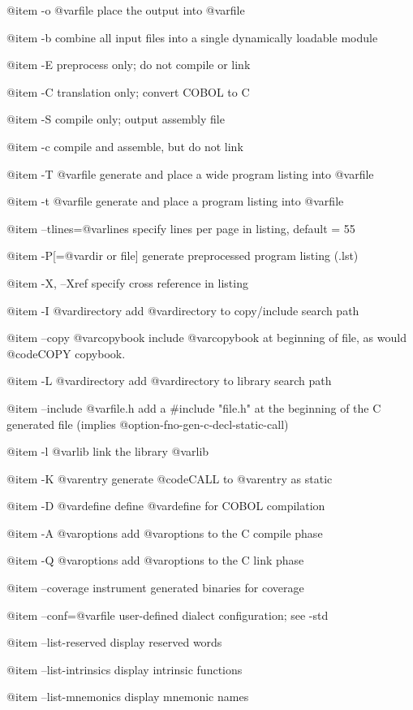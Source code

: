 @item -o @var{file}
place the output into @var{file}

@item -b
combine all input files into a single
dynamically loadable module

@item -E
preprocess only; do not compile or link

@item -C
translation only; convert COBOL to C

@item -S
compile only; output assembly file

@item -c
compile and assemble, but do not link

@item -T @var{file}
generate and place a wide program listing into @var{file}

@item -t @var{file}
generate and place a program listing into @var{file}

@item --tlines=@var{lines}
specify lines per page in listing, default = 55

@item -P[=@var{dir or file}]
generate preprocessed program listing (.lst)

@item -X, --Xref
specify cross reference in listing

@item -I @var{directory}
add @var{directory} to copy/include search path

@item --copy @var{copybook}
include @var{copybook} at beginning of file,
as would @code{COPY} copybook.

@item -L @var{directory}
add @var{directory} to library search path

@item --include @var{file.h}
add a #include "file.h" at the beginning of the C
generated file (implies @option{-fno-gen-c-decl-static-call})

@item -l @var{lib}
link the library @var{lib}

@item -K @var{entry}
generate @code{CALL} to @var{entry} as static

@item -D @var{define}
define @var{define} for COBOL compilation

@item -A @var{options}
add @var{options} to the C compile phase

@item -Q @var{options}
add @var{options} to the C link phase

@item --coverage
instrument generated binaries for coverage

@item --conf=@var{file}
user-defined dialect configuration; see -std

@item --list-reserved
display reserved words

@item --list-intrinsics
display intrinsic functions

@item --list-mnemonics
display mnemonic names

